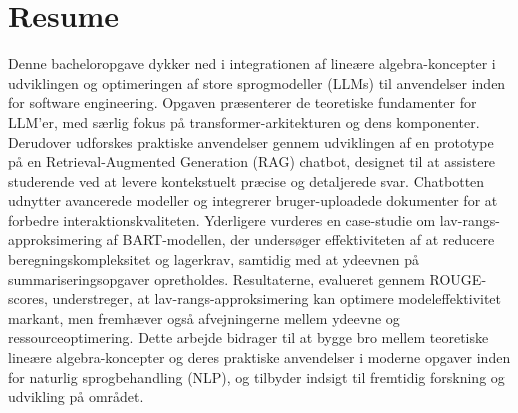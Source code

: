 \documentclass[a4paper,twoside, 12pt]{memoir} %
\begin{document}
\chapter*{Resume}
Denne bacheloropgave dykker ned i integrationen af lineære algebra-koncepter i udviklingen og optimeringen af store sprogmodeller (LLMs) til anvendelser inden for software engineering. 
Opgaven præsenterer de teoretiske fundamenter for LLM'er, med særlig fokus på transformer-arkitekturen og dens komponenter. 
Derudover udforskes praktiske anvendelser gennem udviklingen af en prototype på en Retrieval-Augmented Generation (RAG) chatbot, designet til at assistere studerende ved at levere kontekstuelt præcise og detaljerede svar. 
Chatbotten udnytter avancerede modeller og integrerer bruger-uploadede dokumenter for at forbedre interaktionskvaliteten. Yderligere vurderes en case-studie om lav-rangs-approksimering af BART-modellen, der undersøger effektiviteten af at reducere beregningskompleksitet og lagerkrav, samtidig med at ydeevnen på summariseringsopgaver opretholdes. 
Resultaterne, evalueret gennem ROUGE-scores, understreger, at lav-rangs-approksimering kan optimere modeleffektivitet markant, men fremhæver også afvejningerne mellem ydeevne og ressourceoptimering. Dette arbejde bidrager til at bygge bro mellem teoretiske lineære algebra-koncepter og deres praktiske anvendelser i moderne opgaver inden for naturlig sprogbehandling (NLP), og tilbyder indsigt til fremtidig forskning og udvikling på området.

\newpage
\tableofcontents*









\printbibliography

\appendix



\end{document}
